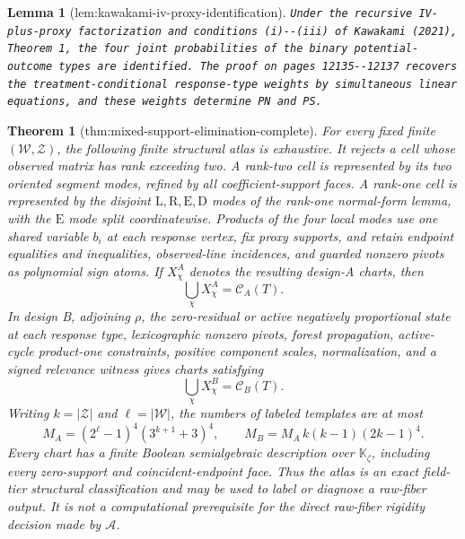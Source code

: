 \documentclass{article}
\newtheorem{theorem}{Theorem}
\newtheorem{lemma}{Lemma}
\begin{document}
\begin{lemma}[lem:kawakami-iv-proxy-identification]\label{lem:kawakami-iv-proxy-identification}
\texttt{Under the recursive IV-\allowbreak{}plus-\allowbreak{}proxy factorization and conditions (i)-\allowbreak{}-\allowbreak{}(iii) of Kawakami (2021),\allowbreak{} Theorem 1,\allowbreak{} the four joint probabilities of the binary potential-\allowbreak{}outcome types are identified.  The proof on pages 12135-\allowbreak{}-\allowbreak{}12137 recovers the treatment-\allowbreak{}conditional response-\allowbreak{}type weights by simultaneous linear equations,\allowbreak{} and these weights determine PN and PS.}
\end{lemma}

\begin{theorem}[thm:mixed-support-elimination-complete]\label{thm:mixed-support-elimination-complete}
For every fixed finite \((\mathcal W,\mathcal Z)\), the following finite structural atlas is exhaustive.  It rejects a cell whose observed matrix has rank exceeding two.  A rank-two cell is represented by its two oriented segment modes, refined by all coefficient-support faces.  A rank-one cell is represented by the disjoint \(\mathrm L,\mathrm R,\mathrm E,\mathrm D\) modes of the rank-one normal-form lemma, with the \(\mathrm E\) mode split coordinatewise.  Products of the four local modes use one shared variable \(b_i\) at each response vertex, fix proxy supports, and retain endpoint equalities and inequalities, observed-line incidences, and guarded nonzero pivots as polynomial sign atoms.  If \(X^A_\chi\) denotes the resulting design-A charts, then
\[
\bigcup_\chi X^A_\chi=\mathcal C_A(T).
\]
In design B, adjoining \(\rho\), the zero-residual or active negatively proportional state at each response type, lexicographic nonzero pivots, forest propagation, active-cycle product-one constraints, positive component scales, normalization, and a signed relevance witness gives charts satisfying
\[
\bigcup_\chi X^B_\chi=\mathcal C_B(T).
\]
Writing \(k=|\mathcal Z|\) and \(\ell=|\mathcal W|\), the numbers of labeled templates are at most
\[
M_A=(2^{\ell}-1)^4(3^{k+1}+3)^4,
\qquad
M_B=M_A\,k(k-1)(2k-1)^4.
\]
Every chart has a finite Boolean semialgebraic description over \(\mathbb K_{\zeta}\), including every zero-support and coincident-endpoint face.  Thus the atlas is an exact field-tier structural classification and may be used to label or diagnose a raw-fiber output.  It is not a computational prerequisite for the direct raw-fiber rigidity decision made by \(\mathscr A\).
\end{theorem}
\end{document}
